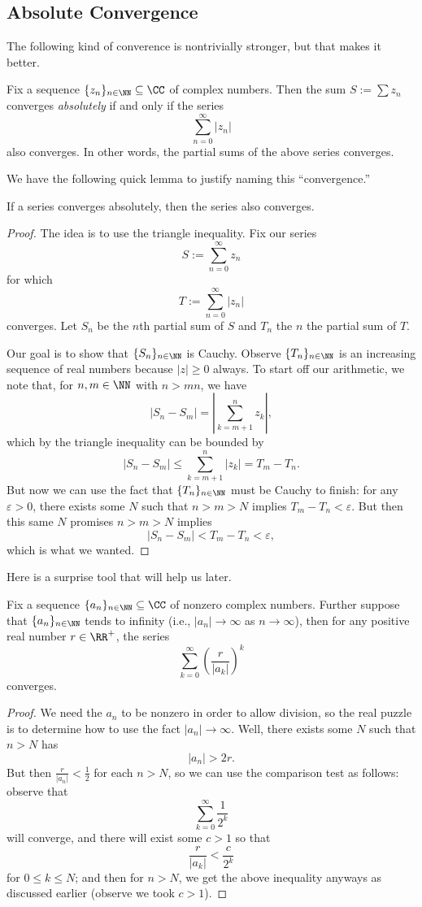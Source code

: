 \subsection{Absolute Convergence}
The following kind of converence is nontrivially stronger, but that makes it better.
\begin{definition}
	Fix a sequence $\{z_n\}_{n\in\NN}\subseteq\CC$ of complex numbers. Then the sum $S:=\sum z_n$ converges \textit{absolutely} if and only if the series
	\[\sum_{n=0}^\infty|z_n|\]
	also converges. In other words, the partial sums of the above series converges.
\end{definition}
We have the following quick lemma to justify naming this ``convergence.''
\begin{lemma}
	If a series converges absolutely, then the series also converges.
\end{lemma}
\begin{proof}
	The idea is to use the triangle inequality. Fix our series
	\[S:=\sum_{n=0}^\infty z_n\]
	for which
	\[T:=\sum_{n=0}^\infty|z_n|\]
	converges. Let $S_n$ be the $n$th partial sum of $S$ and $T_n$ the $n$ the partial sum of $T$.
	
	Our goal is to show that $\{S_n\}_{n\in\NN}$ is Cauchy. Observe $\{T_n\}_{n\in\NN}$ is an increasing sequence of real numbers because $|z|\ge0$ always. To start off our arithmetic, we note that, for $n,m\in\NN$ with $n>mn$, we have
	\[|S_n-S_m|=\left|\sum_{k=m+1}^nz_k\right|,\]
	which by the triangle inequality can be bounded by
	\[|S_n-S_m|\le\sum_{k=m+1}^n|z_k|=T_m-T_n.\]
	But now we can use the fact that $\{T_n\}_{n\in\NN}$ must be Cauchy to finish: for any $\varepsilon>0$, there exists some $N$ such that $n>m>N$ implies $T_m-T_n<\varepsilon$. But then this same $N$ promises $n>m>N$ implies
	\[|S_n-S_m|<T_m-T_n<\varepsilon,\]
	which is what we wanted.
\end{proof}
Here is a surprise tool that will help us later.
\begin{lemma}
	Fix a sequence $\{a_n\}_{n\in\NN}\subseteq\CC$ of nonzero complex numbers. Further suppose that $\{a_n\}_{n\in\NN}$ tends to infinity (i.e., $|a_n|\to\infty$ as $n\to\infty$), then for any positive real number $r\in\RR^+$, the series
	\[\sum_{k=0}^\infty\left(\frac r{|a_k|}\right)^k\]
	converges.
\end{lemma}
\begin{proof}
	We need the $a_n$ to be nonzero in order to allow division, so the real puzzle is to determine how to use the fact $|a_n|\to\infty$. Well, there exists some $N$ such that $n>N$ has
	\[|a_n|>2r.\]
	But then $\frac r{|a_n|}<\frac12$ for each $n>N$, so we can use the comparison test as follows: observe that
	\[\sum_{k=0}^\infty\frac1{2^k}\]
	will converge, and there will exist some $c>1$ so that
	\[\frac r{|a_k|}<\frac c{2^k}\]
	for $0\le k\le N$; and then for $n>N$, we get the above inequality anyways as discussed earlier (observe we took $c>1$).
\end{proof}
